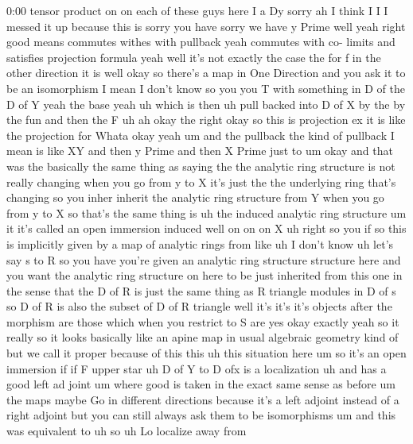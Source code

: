 \begin{unfinished}{0:00}
tensor  product  on  on  each  of  these  guys
here  I  a  Dy  sorry  ah  I  think  I  I  I
messed  it  up  because  this  is  sorry  you
have  sorry  we  have  y  Prime  well  yeah
right  good  means  commutes
withes  with
pullback  yeah  commutes  with  co-
limits  and  satisfies  projection  formula
yeah  well  it's  not  exactly  the  case  the
for  f  in  the  other  direction  it  is  well
okay  so  there's  a  map  in  One  Direction
and  you  ask  it  to  be  an  isomorphism  I
mean  I  don't  know  so  you  you  T  with
something  in  D  of  the  D  of  Y  yeah  the
base  yeah  uh  which  is
then  uh  pull  backed  into  D  of  X  by  the
by  the  fun  and  then  the
F
uh  ah  okay  the  right  okay  so  this  is
projection  ex  it  is  like  the  projection
for  Whata  okay
yeah
um  and  the  pullback  the  kind  of  pullback
I  mean  is  like  XY  and  then  y  Prime  and
then  X  Prime  just
to
um  okay  and  that  was
the  basically  the  same  thing  as  saying
the  the  analytic  ring  structure  is  not
really  changing  when  you  go  from  y  to  X
it's  just  the  the  underlying  ring  that's
changing  so  you  inher  inherit  the
analytic  ring  structure  from  Y  when  you
go  from  y  to  X  so  that's  the  same  thing
is  uh  the  induced  analytic  ring
structure  um  it  it's  called  an  open
immersion  induced  well  on  on  on  X  uh
right  so  you  if  so  this  is  implicitly
given  by  a  map  of  analytic  rings  from
like  uh  I  don't  know  uh  let's  say  s  to
R  so  you  have  you're  given  an  analytic
ring  structure  structure  here  and  you
want  the  analytic  ring  structure  on  here
to  be  just  inherited  from  this  one  in
the  sense  that  the  D  of  R  is  just  the
same  thing  as  R  triangle  modules  in  D  of
s  so  D  of  R  is  also  the  subset  of  D  of  R
triangle  well  it's  it's  it's  objects
after  the  morphism  are  those  which  when
you  restrict  to  S  are  yes  okay  exactly
yeah  so  it  really  so  it  looks  basically
like  an  apine  map  in  usual  algebraic
geometry  kind  of  but  we  call  it  proper
because  of
this  this  uh  this  situation  here  um  so
it's  an  open  immersion
if  if  F  upper
star  uh  D  of  Y  to  D
ofx  is  a
localization  uh  and  has  a  good  left  ad
joint
um  where  good  is  taken  in  the  exact  same
sense  as
before  um  the  maps  maybe  Go  in  different
directions  because  it's  a  left  adjoint
instead  of  a  right  adjoint  but  you  can
still  always  ask  them  to  be
isomorphisms
um  and  this  was  equivalent  to
uh  so  uh  Lo  localize  away  from

\end{unfinished}
